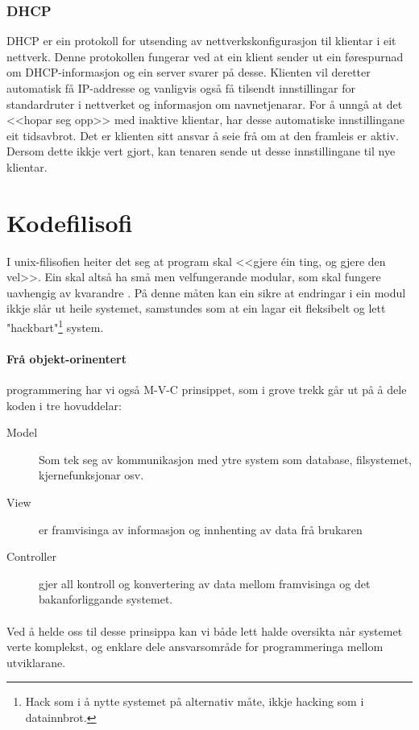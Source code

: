 \documentclass[nynorsk,12pt,a4paper,oneside]{book}
\begin{document}
\subsubsection{DHCP}
DHCP er ein protokoll for utsending av nettverkskonfigurasjon til klientar i eit nettverk. Denne protokollen fungerar ved at ein klient sender ut ein førespurnad om DHCP-informasjon og ein server svarer på desse. Klienten vil deretter automatisk få IP-addresse og vanligvis også få tilsendt innstillingar for standardruter i nettverket og informasjon om navnetjenarar.  \cite{datakom} 
For å unngå at det <<hopar seg opp>> med inaktive klientar, har desse automatiske innstillingane eit tidsavbrot. Det er klienten sitt ansvar å seie frå om at den framleis er aktiv. Dersom dette ikkje vert gjort, kan tenaren sende ut desse innstillingane til nye klientar. \cite{rfc2131}


\section{Kodefilisofi}
I unix-filisofien heiter det seg at program skal <<gjere éin ting, og gjere den vel>>. Ein skal altså ha små men velfungerande modular, som skal fungere uavhengig av kvarandre \cite{unixprog}. På denne måten kan ein sikre at endringar i ein modul ikkje slår ut heile systemet, samstundes som at ein lagar eit fleksibelt og lett "hackbart"\footnote{Hack som i å nytte systemet på alternativ måte, ikkje hacking som i datainnbrot.} system. 

\paragraph{Frå objekt-orinentert} programmering har vi også M-V-C prinsippet, som i grove trekk går ut på å dele koden i tre hovuddelar: \cite{mvc}

\begin{description}
	\item[Model] Som tek seg av kommunikasjon med ytre system som database, filsystemet, kjernefunksjonar osv.
	\item[View] er framvisinga av informasjon og innhenting av data frå brukaren
	\item[Controller] gjer all kontroll og konvertering av data mellom framvisinga og det bakanforliggande systemet.
\end{description}

\paragraph{}
Ved å helde oss til desse prinsippa kan vi både lett halde oversikta når systemet verte komplekst, og enklare dele ansvarsområde for programmeringa mellom utviklarane.
\end{document}

